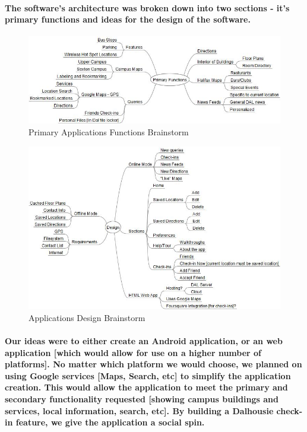 \documentclass{report}
\begin{document}
    \paragraph{The software's architecture was broken down into two sections -
    it's primary functions and ideas for the design of the software.}
    \begin{figure}
        \centering
            \includegraphics[width=\textwidth]{img/figure413.jpg}
        \caption{Primary Applications Functions Brainstorm}
    \end{figure}
    \begin{figure}
        \centering
            \includegraphics[width=\textwidth]{img/figure414.jpg}
        \caption{Applications Design Brainstorm}
    \end{figure}
    \paragraph{Our ideas were to either create an Android application, or an web
    application [which would allow for use on a higher number of platforms]. No
    matter which platform we would choose, we planned on using Google services
    [Maps, Search, etc] to simplify the application creation. This would allow the
    application to meet the primary and secondary functionality requested [showing
    campus buildings and services, local information, search, etc]. By building a
    Dalhousie check-in feature, we give the application a social spin.}
\end{document}
